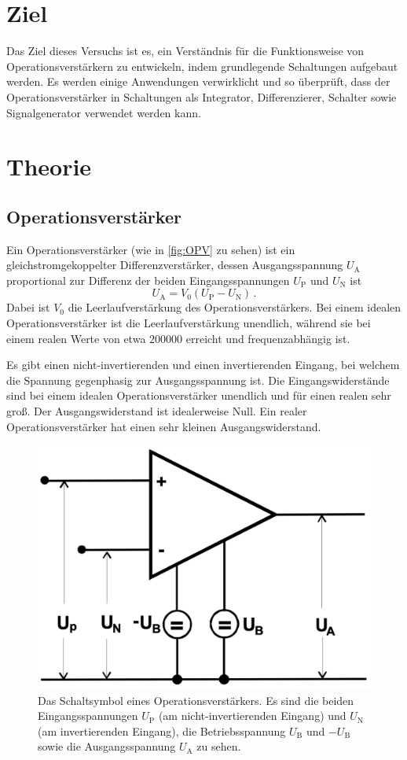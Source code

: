 \section{Ziel}
Das Ziel dieses Versuchs ist es, ein Verständnis für die Funktionsweise von Operationsverstärkern zu entwickeln, indem grundlegende Schaltungen aufgebaut werden.
Es werden einige Anwendungen verwirklicht und so überprüft, dass der Operationsverstärker in Schaltungen als Integrator, Differenzierer, Schalter sowie Signalgenerator verwendet werden kann.


\section{Theorie}

\subsection{Operationsverstärker}
Ein Operationsverstärker (wie in \autoref{fig:OPV} zu sehen) ist ein gleichstromgekoppelter Differenzverstärker, dessen Ausgangsspannung $U_\text{A}$ proportional zur Differenz der beiden Eingangsspannungen $U_\text{P}$ und $U_\text{N}$ ist
\begin{equation*}
    U_\text{A} = V_0 (U_\text{P} - U_\text{N}) \, .
\end{equation*}
Dabei ist $V_0$ die Leerlaufverstärkung des Operationsverstärkers. Bei einem idealen Operationsverstärker ist die Leerlaufverstärkung unendlich, während sie bei einem realen Werte von etwa $\num{200000}$ \cite{Verstaerkung} erreicht und frequenzabhängig ist.

Es gibt einen nicht-invertierenden und einen invertierenden Eingang, bei welchem die Spannung gegenphasig zur Ausgangsspannung ist. Die Eingangswiderstände sind bei einem idealen Operationsverstärker unendlich und für einen realen sehr groß. Der Ausgangswiderstand ist idealerweise Null. Ein realer Operationsverstärker hat einen sehr kleinen Ausgangswiderstand.

\begin{figure}
    \centering
    \includegraphics[width=0.5\linewidth]{./figures/OPV.png}
    \caption{Das Schaltsymbol eines Operationsverstärkers. Es sind die beiden Eingangsspannungen $U_\text{P}$ (am nicht-invertierenden Eingang) und $U_\text{N}$ (am invertierenden Eingang), die Betriebsspannung $U_\text{B}$ und $-U_\text{B}$ sowie die Ausgangsspannung $U_\text{A}$ zu sehen.}
    \label{fig:OPV}
\end{figure}

